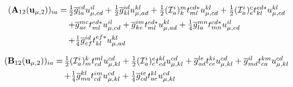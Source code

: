 \begin{subappendices}
    \begin{equation}
        \begin{array}{r@{\,}l}
            (\mathbf{A}_{12}(\mathbf{u}_{\mu,2}))_{ia}
            =
            &
            \tfrac{1}{2}
            \overline{g}_{la}^{cd}
            u_{\mu,cd}^{il}
            +
            \tfrac{1}{2}
            \overline{g}_{kl}^{id}
            u_{\mu,ad}^{kl}
            +
            \tfrac{1}{2}
            (\mathcal{I}_a^i)_k^m
            t_{ml}^{cd*}
            u_{\mu,cd}^{kl}
            +
            \tfrac{1}{2}
            (\mathcal{I}_a^i)_e^c
            t_{kl}^{ed*}
            u_{\mu,cd}^{kl}
            \\[5pt]
            &
            +
            \overline{g}_{ae}^{mc}
            t_{ml}^{ed*}
            u_{\mu,cd}^{il}
            +
            \overline{g}_{ke}^{im}
            t_{ml}^{ed*}
            u_{\mu,ad}^{kl}
            +
            \tfrac{1}{4}
            \overline{g}_{la}^{mn}
            t_{mn}^{cd*}
            u_{\mu,cd}^{il}
            \\[5pt]
            &
            +
            \tfrac{1}{4}
            \overline{g}_{ef}^{id}
            t_{kl}^{ef*}
            u_{\mu,ad}^{kl}
        \end{array}
    \end{equation}

    \begin{equation}
        \begin{array}{r@{\,}l}
            (\mathbf{B}_{12}(\mathbf{u}_{\mu,2}))_{ia}
            =
            &
            \tfrac{1}{2}
            (\mathcal{I}_a^i)_m^k
            t_{cd}^{ml}
            u_{\mu,kl}^{cd}
            +
            \tfrac{1}{2}
            (\mathcal{I}_a^i)_c^e
            t_{ed}^{kl}
            u_{\mu,kl}^{cd}
            +
            \overline{g}_{ad}^{le}
            t_{ce}^{ki}
            u_{\mu,kl}^{cd}
            +
            \overline{g}_{md}^{il}
            t_{ca}^{km}
            u_{\mu,kl}^{cd}
            \\[5pt]
            &
            +
            \tfrac{1}{4}
            \overline{g}_{ma}^{kl}
            t_{cd}^{im}
            u_{\mu,kl}^{cd}
            +
            \tfrac{1}{4}
            \overline{g}_{cd}^{ie}
            t_{ae}^{kl}
            u_{\mu,kl}^{cd}
        \end{array}
    \end{equation}


\end{subappendices}

